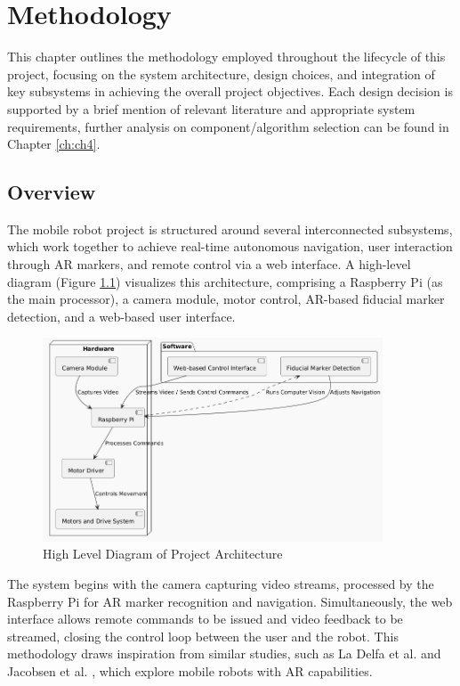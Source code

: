 \chapter{\label{ch:methodology} Methodology}
This chapter outlines the methodology employed throughout the lifecycle of this project, focusing on the system architecture, design choices, and integration of key subsystems in achieving the overall project objectives. Each design decision is supported by a brief mention of relevant literature and appropriate system requirements, further analysis on component/algorithm selection can be found in Chapter \ref{ch:ch4}.

\section{\label{sec:overview} Overview}

The mobile robot project is structured around several interconnected subsystems, which work together to achieve real-time autonomous navigation, user interaction through AR markers, and remote control via a web interface. A high-level diagram (Figure \ref{fig:high_level_diagram}) visualizes this architecture, comprising a Raspberry Pi (as the main processor), a camera module, motor control, AR-based fiducial marker detection, and a web-based user interface. 

\begin{figure}[h]
	\centering
	\includegraphics[width=0.9\textwidth]{ch3/figs/diagram.png}
	\caption{High Level Diagram of Project Architecture}
	\label{fig:high_level_diagram}
\end{figure}


The system begins with the camera capturing video streams, processed by the Raspberry Pi for AR marker recognition and navigation. Simultaneously, the web interface allows remote commands to be issued and video feedback to be streamed, closing the control loop between the user and the robot. This methodology draws inspiration from similar studies, such as La Delfa et al. \cite{delfa2015} and Jacobsen et al. \cite{jacobsen2018}, which explore mobile robots with AR capabilities.

